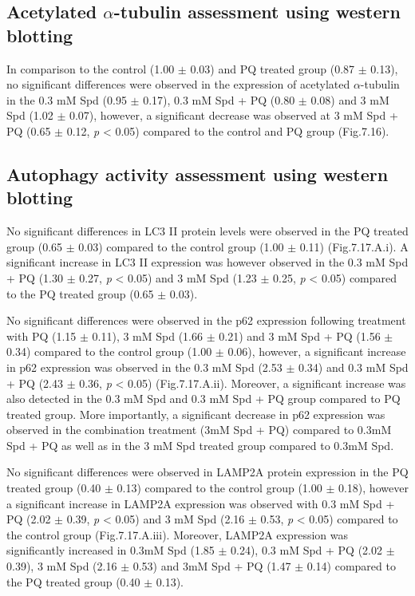 
\subsection{Acetylated $\alpha$-tubulin assessment using western blotting}
In comparison to the control (1.00 $\pm$ 0.03) and PQ treated group (0.87 $\pm$ 0.13), no significant differences were observed in the expression of acetylated $\alpha$-tubulin in the 0.3 mM Spd (0.95 $\pm$ 0.17), 0.3 mM Spd + PQ (0.80 $\pm$ 0.08) and 3 mM Spd (1.02 $\pm$ 0.07), however, a significant decrease was observed at 3 mM Spd + PQ (0.65 $\pm$ 0.12, \textit{p} < 0.05) compared to the control and PQ group (Fig.7.16). 


\subsection{Autophagy activity assessment using western blotting}
No significant differences in LC3 II protein levels were observed in the PQ treated group (0.65 $\pm$ 0.03) compared to the control group (1.00 $\pm$ 0.11) (Fig.7.17.A.i). A significant increase in LC3 II expression was however observed in the 0.3 mM Spd + PQ (1.30 $\pm$ 0.27, \textit{p} < 0.05) and 3 mM Spd (1.23 $\pm$ 0.25, \textit{p} < 0.05) compared to the PQ treated group (0.65 $\pm$ 0.03). 

No significant differences were observed in the p62 expression following treatment with PQ (1.15 $\pm$ 0.11), 3 mM Spd (1.66 $\pm$ 0.21) and 3 mM Spd + PQ (1.56 $\pm$ 0.34) compared to the control  group (1.00 $\pm$ 0.06), however, a significant increase in p62 expression was observed in the 0.3 mM Spd (2.53 $\pm$ 0.34) and 0.3 mM Spd + PQ (2.43 $\pm$ 0.36, \textit{p} < 0.05) (Fig.7.17.A.ii). Moreover, a significant increase was also detected in the 0.3 mM Spd and 0.3 mM Spd + PQ group compared to PQ treated group. More importantly, a significant decrease in p62 expression was observed in the combination treatment (3mM Spd + PQ) compared to 0.3mM Spd + PQ as well as in the 3 mM Spd treated group compared to 0.3mM Spd. 

No significant differences were observed in LAMP2A protein expression in the PQ treated group (0.40 $\pm$ 0.13) compared to the control group (1.00 $\pm$ 0.18), however a significant increase in LAMP2A expression was observed with 0.3 mM Spd + PQ (2.02 $\pm$ 0.39, \textit{p} < 0.05) and 3 mM Spd (2.16 $\pm$ 0.53, \textit{p} < 0.05) compared to the control group (Fig.7.17.A.iii). Moreover, LAMP2A expression was significantly increased in 0.3mM Spd (1.85 $\pm$ 0.24), 0.3 mM Spd + PQ (2.02 $\pm$ 0.39), 3 mM Spd (2.16 $\pm$ 0.53) and 3mM Spd + PQ (1.47 $\pm$ 0.14) compared to the PQ treated group (0.40 $\pm$ 0.13).

